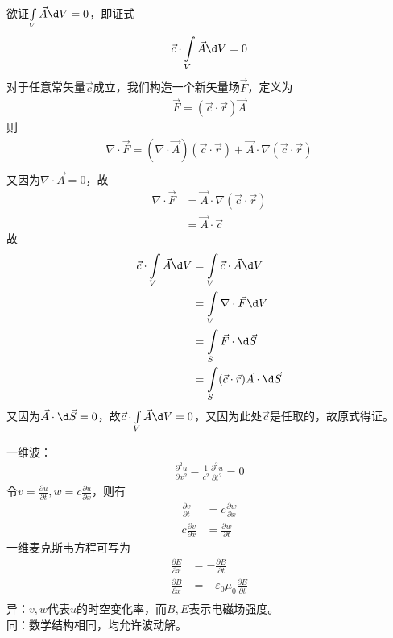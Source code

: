 \documentclass{phyasgn}
\begin{document}
\begin{sol}[3]
    欲证$\int\limits_V\vec{A}\d V=0$，即证式
    \begin{align*}
        \vec{c}\cdot\int\limits_V\vec{A}\d V=0
    \end{align*}
    对于任意常矢量$\vec{c}$成立，我们构造一个新矢量场$\vec{F}$，定义为
    \begin{align*}
        \vec{F}=(\vec{c}\cdot \vec{r})\vec{A}
    \end{align*}
    则
    \begin{align*}
        \nabla\cdot\vec{F}=(\nabla\cdot\vec{A})(\vec{c}\cdot\vec{r})+\vec{A}\cdot\nabla(\vec{c}\cdot\vec{r})\\
    \end{align*}
    又因为$\nabla\cdot\vec{A}=0$，故
    \begin{align*}
        \nabla\cdot\vec{F}&=\vec{A}\cdot\nabla(\vec{c}\cdot\vec{r})\\
        &=\vec{A}\cdot\vec{c}
    \end{align*}
    故
    \begin{align*}
        \vec{c}\cdot\int\limits_V\vec{A}\d V&=\int\limits_V\vec{c}\cdot\vec{A}\d V\\
        &=\int\limits_V\nabla\cdot\vec{F}\d V\\
        &=\int\limits_S\vec{F}\cdot\d \vec{S}\\
        &=\int\limits_S(\vec{c}\cdot \vec{r})\vec{A}\cdot\d \vec{S}\\
    \end{align*}
    又因为$\vec{A}\cdot\d \vec{S}=0$，故$\vec{c}\cdot\int\limits_V\vec{A}\d V=0$，又因为此处$\vec{c}$是任取的，故原式得证。
\end{sol}\par

\begin{sol}[4]
    一维波：
    \begin{align*}
        \frac{\partial^2u}{\partial x^2}-\frac{1}{c^2}\frac{\partial^2u}{\partial t^2}=0
    \end{align*}
    令$v=\frac{\partial u}{\partial t},w=c\frac{\partial u}{\partial x}$，则有
    \begin{align*}
        \frac{\partial v}{\partial t}&=c\frac{\partial w}{\partial x}\\
        c\frac{\partial v}{\partial x}&=\frac{\partial w}{\partial t}
    \end{align*}
    一维麦克斯韦方程可写为
    \begin{align*}
        \frac{\partial E}{\partial x}&=-\frac{\partial B}{\partial t}\\
        \frac{\partial B}{\partial x}&=-\varepsilon_0\mu_0\frac{\partial E}{\partial t}\\
    \end{align*}
    异：$v,w$代表$u$的时空变化率，而$B,E$表示电磁场强度。\\
    同：数学结构相同，均允许波动解。
\end{sol}\par
\end{document}
